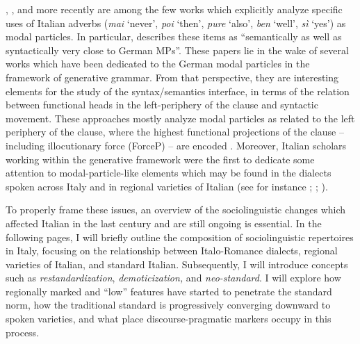 \citet{Coniglio2008}, \citet{Cardinaletti2011}, and more recently \citet{CruschinaCognola2021} are among the few works which explicitly analyze specific uses of Italian adverbs (\textit{mai} ‘never’, \textit{poi} ‘then’, \textit{pure} ‘also’, \textit{ben} ‘well’, \textit{sì} ‘yes’) as modal particles. In particular, \citet[107]{Coniglio2008} describes these items as “semantically as well as syntactically very close to German MPs”. These papers lie in the wake of several works which have been dedicated to the German modal particles in the framework of generative grammar.  From that perspective, they are interesting elements for the study of the syntax/semantics interface, in terms of the relation between functional heads in the left-periphery of the clause and syntactic movement. These approaches mostly analyze modal particles as related to the left periphery of the clause, where the highest functional projections of the clause – including illocutionary force (ForceP) – are encoded \citep{Rizzi1997}. Moreover, Italian scholars working within the generative framework were the first to dedicate some attention to modal-particle-like elements which may be found in the dialects spoken across Italy and in regional varieties of Italian (see for instance \citealt{Cinque1991}; \citealt{Poletto2000}; \citealt{MunaroPoletto2005}).

To properly frame these issues, an overview of the sociolinguistic changes which affected Italian in the last century and are still ongoing is essential. In the following pages, I will briefly outline the composition of sociolinguistic repertoires in Italy, focusing on the relationship between Italo-Romance dialects, regional varieties of Italian, and standard Italian. Subsequently, I will introduce concepts such as \textit{restandardization}, \textit{demoticization,} and \textit{neo-standard}. I will explore how regionally marked and “low” features have started to penetrate the standard norm, how the traditional standard is progressively converging downward to spoken varieties, and what place discourse-pragmatic markers occupy in this process.

